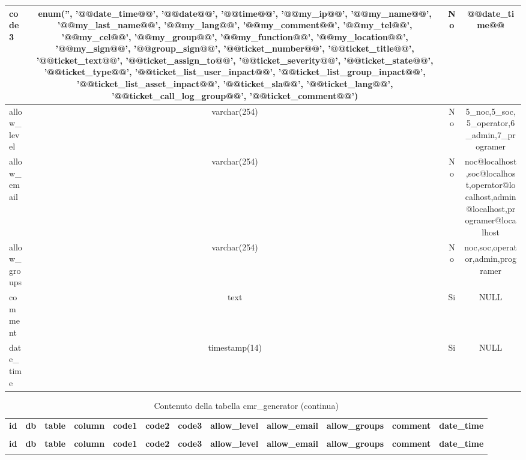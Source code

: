 \begin{longtable}{|l|c|c|c|}
code3 & enum('', '@@date\_time@@', '@@date@@', '@@time@@', '@@my\_ip@@', '@@my\_name@@', '@@my\_last\_name@@', '@@my\_lang@@', '@@my\_comment@@', '@@my\_tel@@', '@@my\_cel@@', '@@my\_group@@', '@@my\_function@@', '@@my\_location@@', '@@my\_sign@@', '@@group\_sign@@', '@@ticket\_number@@', '@@ticket\_title@@', '@@ticket\_text@@', '@@ticket\_assign\_to@@', '@@ticket\_severity@@', '@@ticket\_state@@', '@@ticket\_type@@', '@@ticket\_list\_user\_inpact@@', '@@ticket\_list\_group\_inpact@@', '@@ticket\_list\_asset\_inpact@@', '@@ticket\_sla@@', '@@ticket\_lang@@', '@@ticket\_call\_log\_group@@', '@@ticket\_comment@@') &  No  & @@date\_time@@ \\ \hline 
allow\_level & varchar(254) &  No  & 5\_noc,5\_soc,5\_operator,6\_admin,7\_programer \\ \hline 
allow\_email & varchar(254) &  No  & noc@localhost,soc@localhost,operator@localhost,admin@localhost,programer@localhost \\ \hline 
allow\_groups & varchar(254) &  No  & noc,soc,operator,admin,programer \\ \hline 
comment & text &  Si  & NULL \\ \hline 
date\_time & timestamp(14) &  Si  & NULL \\ \hline 
 \end{longtable}

%
%
 \begin{longtable}{|l|l|l|l|l|l|l|l|l|l|l|l|} 
 \hline \endhead \hline \endfoot \hline 
 \caption{Contenuto della tabella cmr\_generator} \label{tab:cmr_generator-data} \\\hline \multicolumn{1}{|c|}{\textbf{id}} & \multicolumn{1}{|c|}{\textbf{db}} & \multicolumn{1}{|c|}{\textbf{table}} & \multicolumn{1}{|c|}{\textbf{column}} & \multicolumn{1}{|c|}{\textbf{code1}} & \multicolumn{1}{|c|}{\textbf{code2}} & \multicolumn{1}{|c|}{\textbf{code3}} & \multicolumn{1}{|c|}{\textbf{allow\_level}} & \multicolumn{1}{|c|}{\textbf{allow\_email}} & \multicolumn{1}{|c|}{\textbf{allow\_groups}} & \multicolumn{1}{|c|}{\textbf{comment}} & \multicolumn{1}{|c|}{\textbf{date\_time}} \\ \hline \hline  \endfirsthead 
\caption{Contenuto della tabella cmr\_generator (continua)} \\ \hline \multicolumn{1}{|c|}{\textbf{id}} & \multicolumn{1}{|c|}{\textbf{db}} & \multicolumn{1}{|c|}{\textbf{table}} & \multicolumn{1}{|c|}{\textbf{column}} & \multicolumn{1}{|c|}{\textbf{code1}} & \multicolumn{1}{|c|}{\textbf{code2}} & \multicolumn{1}{|c|}{\textbf{code3}} & \multicolumn{1}{|c|}{\textbf{allow\_level}} & \multicolumn{1}{|c|}{\textbf{allow\_email}} & \multicolumn{1}{|c|}{\textbf{allow\_groups}} & \multicolumn{1}{|c|}{\textbf{comment}} & \multicolumn{1}{|c|}{\textbf{date\_time}} \\ \hline \hline \endhead \endfoot
 \end{longtable}

